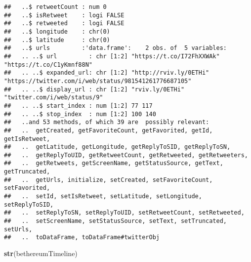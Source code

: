 \documentclass[]{article}
\newenvironment{Shaded}{\begin{snugshade}}{\end{snugshade}}
\newcommand{\KeywordTok}[1]{\textcolor[rgb]{0.13,0.29,0.53}{\textbf{#1}}}
\newcommand{\NormalTok}[1]{#1}
\begin{document}
\begin{verbatim}
##   ..$ retweetCount : num 0
##   ..$ isRetweet    : logi FALSE
##   ..$ retweeted    : logi FALSE
##   ..$ longitude    : chr(0) 
##   ..$ latitude     : chr(0) 
##   ..$ urls         :'data.frame':    2 obs. of  5 variables:
##   .. ..$ url         : chr [1:2] "https://t.co/I72FhXXWAk" "https://t.co/C1yKmnf88N"
##   .. ..$ expanded_url: chr [1:2] "http://rviv.ly/0ETHi" "https://twitter.com/i/web/status/981541261776687105"
##   .. ..$ display_url : chr [1:2] "rviv.ly/0ETHi" "twitter.com/i/web/status/9"
##   .. ..$ start_index : num [1:2] 77 117
##   .. ..$ stop_index  : num [1:2] 100 140
##   ..and 53 methods, of which 39 are  possibly relevant:
##   ..  getCreated, getFavoriteCount, getFavorited, getId, getIsRetweet,
##   ..  getLatitude, getLongitude, getReplyToSID, getReplyToSN,
##   ..  getReplyToUID, getRetweetCount, getRetweeted, getRetweeters,
##   ..  getRetweets, getScreenName, getStatusSource, getText, getTruncated,
##   ..  getUrls, initialize, setCreated, setFavoriteCount, setFavorited,
##   ..  setId, setIsRetweet, setLatitude, setLongitude, setReplyToSID,
##   ..  setReplyToSN, setReplyToUID, setRetweetCount, setRetweeted,
##   ..  setScreenName, setStatusSource, setText, setTruncated, setUrls,
##   ..  toDataFrame, toDataFrame#twitterObj
\end{verbatim}

\begin{Shaded}
\begin{Highlighting}[]
\KeywordTok{str}\NormalTok{(bethereumTimeline)}
\end{Highlighting}
\end{Shaded}
\end{document}
